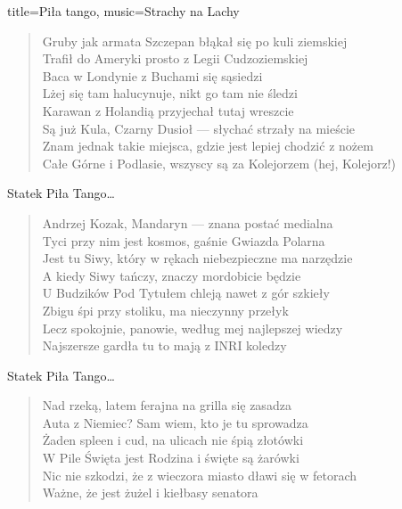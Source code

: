 \begin{song}{title={Piła tango}, music={Strachy na Lachy}}
\begin{verse}
        Gruby jak armata Szczepan błąkał się po kuli ziemskiej \\
        Trafił do Ameryki prosto z Legii Cudzoziemskiej \\
        Baca w Londynie z Buchami się sąsiedzi \\
        Lżej się tam halucynuje, nikt go tam nie śledzi \\
        Karawan z Holandią przyjechał tutaj wreszcie \\
        Są już Kula, Czarny Dusioł --- słychać strzały na mieście \\
        Znam jednak takie miejsca, gdzie jest lepiej chodzić z nożem \\
        Całe Górne i Podlasie, wszyscy są za Kolejorzem (hej, Kolejorz!)
    \end{verse}
    \begin{chorus}
        Statek Piła Tango\ldots
    \end{chorus}
    \begin{verse}
        Andrzej Kozak, Mandaryn --- znana postać medialna \\
        Tyci przy nim jest kosmos, gaśnie Gwiazda Polarna \\
        Jest tu Siwy, który w rękach niebezpieczne ma narzędzie \\
        A kiedy Siwy tańczy, znaczy mordobicie będzie \\
        U Budzików Pod Tytułem chleją nawet z gór szkieły \\
        Zbigu śpi przy stoliku, ma nieczynny przełyk \\
        Lecz spokojnie, panowie, według mej najlepszej wiedzy \\
        Najszersze gardła tu to mają z INRI koledzy
    \end{verse}
    \begin{chorus}
        Statek Piła Tango\ldots
    \end{chorus}
    \begin{verse}
        Nad rzeką, latem ferajna na grilla się zasadza \\
        Auta z Niemiec? Sam wiem, kto je tu sprowadza \\
        Żaden spleen i cud, na ulicach nie śpią złotówki \\
        W Pile Święta jest Rodzina i święte są żarówki \\
        Nic nie szkodzi, że z wieczora miasto dławi się w fetorach \\
        Ważne, że jest żużel i kiełbasy senatora \\

\end{verse}
\end{song}
